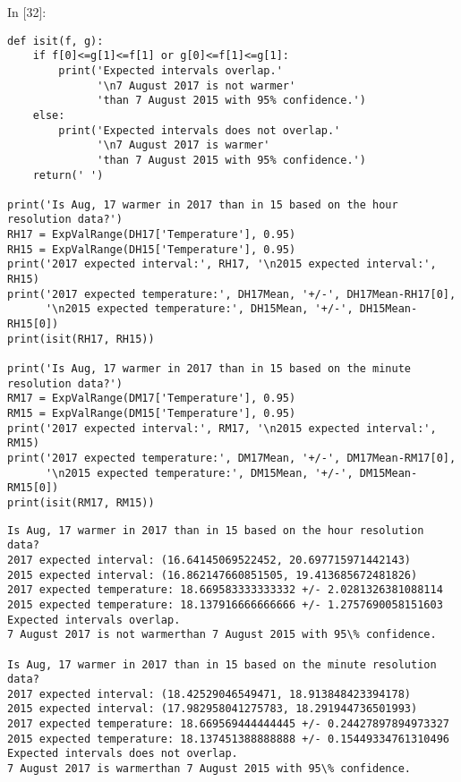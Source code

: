 \documentclass[11pt]{article}
\newif\ifcode
\newif\ifleftmargins
\newlength{\promptlength}
\newcommand{\prompt}[3]{
        \needspace{1.1cm}
        \settowidth{\promptlength}{ #1 [#3] }
        \ifleftmargins\hspace{-\promptlength}\hspace{-5pt}\fi
        {\color{#2}#1 [#3]:}
        \ifleftmargins\vspace{-2.7ex}\fi
    }
\begin{document}
    
\prompt{In}{incolor}{32}
\codetrue
\begin{tcolorbox}[breakable, size=fbox, boxrule=1pt, pad at break*=1mm, colback=cellbackground, colframe=cellborder]
\begin{verbatim}
def isit(f, g):
    if f[0]<=g[1]<=f[1] or g[0]<=f[1]<=g[1]:
        print('Expected intervals overlap.'
              '\n7 August 2017 is not warmer' 
              'than 7 August 2015 with 95% confidence.')
    else: 
        print('Expected intervals does not overlap.'
              '\n7 August 2017 is warmer' 
              'than 7 August 2015 with 95% confidence.')
    return(' ')

print('Is Aug, 17 warmer in 2017 than in 15 based on the hour resolution data?')
RH17 = ExpValRange(DH17['Temperature'], 0.95)
RH15 = ExpValRange(DH15['Temperature'], 0.95)
print('2017 expected interval:', RH17, '\n2015 expected interval:', RH15)
print('2017 expected temperature:', DH17Mean, '+/-', DH17Mean-RH17[0], 
      '\n2015 expected temperature:', DH15Mean, '+/-', DH15Mean-RH15[0])
print(isit(RH17, RH15))

print('Is Aug, 17 warmer in 2017 than in 15 based on the minute resolution data?')
RM17 = ExpValRange(DM17['Temperature'], 0.95)
RM15 = ExpValRange(DM15['Temperature'], 0.95)
print('2017 expected interval:', RM17, '\n2015 expected interval:', RM15)
print('2017 expected temperature:', DM17Mean, '+/-', DM17Mean-RM17[0], 
      '\n2015 expected temperature:', DM15Mean, '+/-', DM15Mean-RM15[0])
print(isit(RM17, RM15))
\end{verbatim}
\end{tcolorbox}
\codefalse

    \begin{Verbatim}[commandchars=\\\{\}]
Is Aug, 17 warmer in 2017 than in 15 based on the hour resolution data?
2017 expected interval: (16.64145069522452, 20.697715971442143)
2015 expected interval: (16.862147660851505, 19.413685672481826)
2017 expected temperature: 18.669583333333332 +/- 2.0281326381088114
2015 expected temperature: 18.137916666666666 +/- 1.2757690058151603
Expected intervals overlap.
7 August 2017 is not warmerthan 7 August 2015 with 95\% confidence.

Is Aug, 17 warmer in 2017 than in 15 based on the minute resolution data?
2017 expected interval: (18.42529046549471, 18.913848423394178)
2015 expected interval: (17.982958041275783, 18.291944736501993)
2017 expected temperature: 18.669569444444445 +/- 0.24427897894973327
2015 expected temperature: 18.137451388888888 +/- 0.15449334761310496
Expected intervals does not overlap.
7 August 2017 is warmerthan 7 August 2015 with 95\% confidence.


    \end{Verbatim}


    
    
    
    
\end{document}
